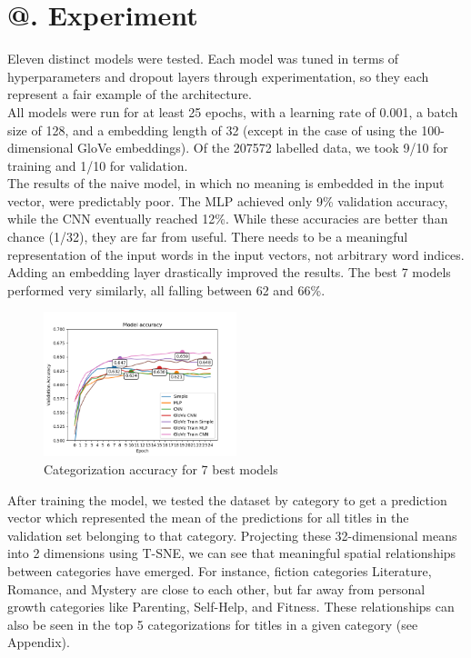 \documentclass[jou,apacite, 10px]{apa6}
\makeatletter
\newcommand*{\rom}[1]{\expandafter\@slowromancap\romannumeral #1@}
\makeatother
\begin{document}
\section{\rom{5}. Experiment}
Eleven distinct models were tested. Each model was tuned in terms of hyperparameters and dropout layers through experimentation, so they each represent a fair example of the architecture.\\
All models were run for at least 25 epochs, with a learning rate of 0.001, a batch size of 128, and a embedding length of 32 (except in the case of using the 100-dimensional GloVe embeddings). Of the 207572 labelled data, we took 9/10 for training and 1/10 for validation.\\
The results of the naive model, in which no meaning is embedded in the input vector, were predictably poor. The MLP achieved only 9\% validation accuracy, while the CNN eventually reached 12\%. While these accuracies are better than chance (1/32), they are far from useful. There needs to be a meaningful representation of the input words in the input vectors, not arbitrary word indices.\\
Adding an embedding layer drastically improved the results. The best 7 models performed very similarly, all falling between 62 and 66\%.\\
\begin{figure}[h!]
    \centering
     \includegraphics[width=0.5\textwidth]{images/good_models_comparison_small}
        \caption{Categorization accuracy for 7 best models}
\end{figure}
After training the model, we tested the dataset by category to get a prediction vector which represented the mean of the predictions for all titles in the validation set belonging to that category. Projecting these 32-dimensional means into 2 dimensions using T-SNE, we can see that meaningful spatial relationships between categories have emerged. For instance, fiction categories Literature, Romance, and Mystery are close to each other, but far away from personal growth categories like Parenting, Self-Help, and Fitness. These relationships can also be seen in the top 5 categorizations for titles in a given category (see Appendix).\\
\end{document}
